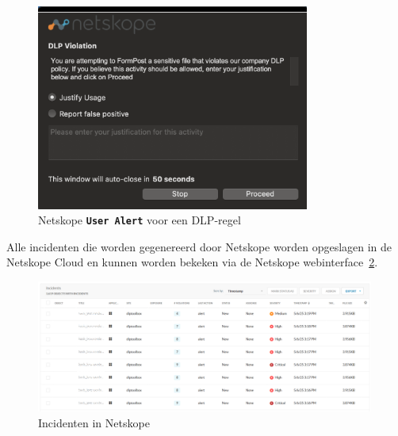 \begin{figure}[H]
    \centering
    \includegraphics[width=0.8\textwidth]{img/netskopealert.png}
    \caption{Netskope \textbf{\texttt{User Alert}} voor een DLP-regel}
    \label{fig:netskope}
\end{figure}

Alle incidenten die worden gegenereerd door Netskope worden opgeslagen in de Netskope Cloud en kunnen worden bekeken via de Netskope webinterface~\ref{fig:netskope_incidenten}.

\begin{figure}[H]
    \centering
    \scriptsize
    \includegraphics[width=0.99\textwidth]{img/netskope_incidents2.png}
    \caption{Incidenten in Netskope}
    \label{fig:netskope_incidenten}
\end{figure}
